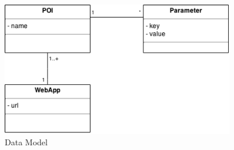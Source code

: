 \begin{figure}[!ht]
  \centering
    \includegraphics[width=0.9\textwidth]{img/smart-places-uml}
    \caption{Data Model}
    \label{fig:uml}
\end{figure}
